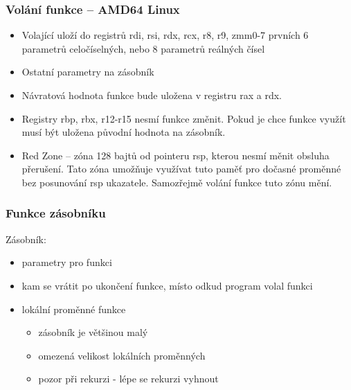 \documentclass{beamer}
\begin{document}
\begin{frame}
\frametitle{Volání funkce -- AMD64 Linux}

\begin{itemize}
\item Volající uloží do registrů rdi, rsi, rdx, rcx, r8, r9, zmm0-7 prvních 6 parametrů celočíselných, nebo 8 parametrů reálných čísel
\item Ostatní parametry na zásobník
\end{itemize}

\bigskip

\begin{itemize}
\item Návratová hodnota funkce bude uložena v registru rax a rdx.
\item Registry rbp, rbx, r12-r15 nesmí funkce změnit. Pokud je chce funkce využít musí být uložena původní hodnota na zásobník.
\item Red Zone -- zóna 128 bajtů od pointeru rsp, kterou nesmí měnit obsluha přerušení. Tato zóna umožňuje využívat tuto paměť pro dočasné proměnné bez posunování rsp ukazatele.
Samozřejmě volání funkce tuto zónu mění.
\end{itemize}

\end{frame}



\begin{frame}
\frametitle{Funkce zásobníku}

Zásobník:
\begin{itemize}
  \item parametry pro funkci
  \item kam se vrátit po ukončení funkce, místo odkud program volal funkci
  \item lokální proměnné funkce
  \begin{itemize}
    \item zásobník je většinou malý
    \item omezená velikost lokálních proměnných
    \item pozor při rekurzi - lépe se rekurzi vyhnout
  \end{itemize}
\end{itemize}

\end{frame}
\end{document}
